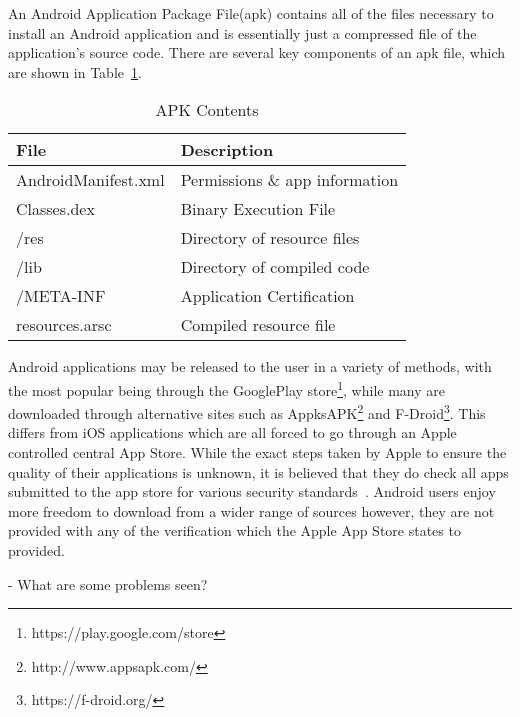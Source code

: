 \documentclass{sig-alternate}
\begin{document}
An Android Application Package File(apk) contains all of the files necessary to install an Android application and is essentially just a compressed file of the application's source code. There are several key components of an apk file, which are shown in Table~\ref{Table:apkcontents}.


\begin{center}

\begin{table}[ht]%
\caption{APK Contents}
\label{Table:apkcontents}
  \begin{tabular}{ l | l  }

    \bfseries File & \bfseries Description \\ \hline
    AndroidManifest.xml & Permissions \& app information \\ \hline
    Classes.dex & Binary Execution File \\ \hline
    /res & Directory of resource files \\ \hline
    /lib & Directory of compiled code \\ \hline
    /META-INF & Application Certification \\ \hline
    resources.arsc & Compiled resource file \\
  \end{tabular}
\end{table}
\end{center}


Android applications may be released to the user in a variety of methods, with the most popular being through the GooglePlay store\footnote{https://play.google.com/store}, while many are downloaded through alternative sites such as AppksAPK\footnote{http://www.appsapk.com/} and F-Droid\footnote{https://f-droid.org/}. This differs from iOS applications which are all forced to go through an Apple controlled central App Store. While the exact steps taken by Apple to ensure the quality of their applications is unknown, it is believed that they do check all apps submitted to the app store for various security standards~\cite{Chin:2012:MUC:2335356.2335358}. Android users enjoy more freedom to download from a wider range of sources however, they are not provided with any of the verification which the Apple App Store states to provided.

- What are some problems seen?
\end{document}
